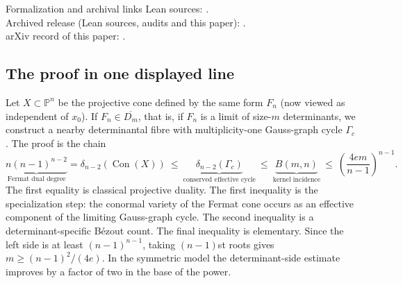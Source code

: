 \documentclass[acmsmall,screen,nonacm]{acmart}
\theoremstyle{definition}
\theoremstyle{remark}
\DeclareMathOperator{\Con}{Con}
\newcommand{\PP}{\mathbb{P}}
\newcommand{\pdeg}{\delta}
\begin{document}
\begin{readerbox}{Formalization and archival links}
Lean sources: \leanRepositoryURL.\\
Archived release (Lean sources, audits and this paper): \leanArchiveDOI.\\
arXiv record of this paper: \leanPaperURL.
\end{readerbox}

\subsection{The proof in one displayed line}

Let $X\subset\PP^n$ be the projective cone defined by the same form $F_n$ (now viewed as independent of $x_0$).  If $F_n\in\overline{D_m}$, that is, if $F_n$ is a limit of size-$m$ determinants, we construct a nearby determinantal fibre with multiplicity-one Gauss-graph cycle $\Gamma_c$.  The proof is the chain
\begin{equation}\label{eq:one-line-proof}
\underbrace{n(n-1)^{n-2}}_{\text{Fermat dual degree}}
=\pdeg_{n-2}(\Con(X))
\ \le\ 
\underbrace{\pdeg_{n-2}(\Gamma_c)}_{\text{conserved effective cycle}}
\ \le\ 
\underbrace{B(m,n)}_{\text{kernel incidence}}
\ \le\ 
\left(\frac{4em}{n-1}\right)^{n-1}.
\end{equation}
The first equality is classical projective duality.  The first inequality is the specialization step: the conormal variety of the Fermat cone occurs as an effective component of the limiting Gauss-graph cycle.  The second inequality is a determinant-specific B\'ezout count.  The final inequality is elementary.  Since the left side is at least $(n-1)^{n-1}$, taking $(n-1)$st roots gives $m\ge(n-1)^2/(4e)$.  In the symmetric model the determinant-side estimate improves by a factor of two in the base of the power.
\end{document}
